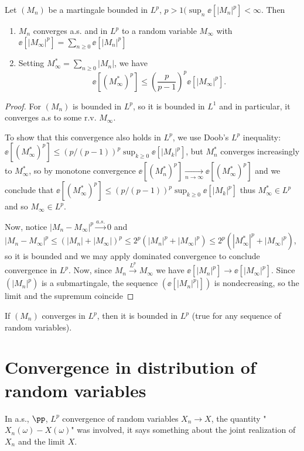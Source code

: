 \documentclass[../main.tex]{subfiles}
\begin{document}
\begin{theorem}
  [$L^p$ Martingales]
  Let $(M_n)$ be a martingale bounded in $L^p$, $p > 1 (\sup_{n} \ee[|M_n|^p]
  < \infty$. Then
  \begin{enumerate}
    \item $M_n$ converges a.s. and in $L^p$ to a random variable $M_{\infty}$
      with $\ee[|M_{\infty}|^p] = \sum_{n \geq 0}\ee[|M_n|^p]$
    \item Setting $M_{\infty}^* = \sum_{n \geq 0} |M_n|$, we have
      \[
        \ee[(M_{\infty}^*)^p] \leq \left(\frac{p}{p-1}\right)^p
        \ee[|M_{\infty}|^p] 
      .\] 
  \end{enumerate}
\end{theorem}
\begin{proof}
  For  $(M_n)$ is bounded in $L^p$, so it is bounded in $L^1$ and in
  particular, it converges a.s to some r.v. $M_\infty$. 

  To show that this
  convergence also holds in $L^p$, we use Doob's $L^p$ inequality:
  $\ee[(M_{\infty}^*)^p] \leq (p/(p-1))^p \sup_{k \geq 0} \ee[|M_k|^p]$, but 
  $M_n^*$ converges increasingly to $M_{\infty}^*$, so by monotone convergence
  $\ee[(M_n^{*})^p] \underset{n \to \infty}{\longrightarrow}
  \ee[(M_{\infty}^*)^p]$ and we conclude that $\ee[(M_{\infty}^*)^p] \leq
  (p/(p-1))^p \sup_{k \geq 0} \ee[|M_k|^p]$ thus $M_{\infty}^* \in L^p$ and so
   $M_{\infty} \in L^p$. 

   Now, notice $|M_n - M_{\infty}|^p \overset{a.s.}{\longrightarrow} 0$ and
   $|M_n - M_{\infty}|^p \leq (|M_n| + |M_{\infty}|)^p \leq 2^p (|M_n|^p +
   |M_{\infty}|^p) \leq 2^p (|M_{\infty}^*|^p +
   |M_{\infty}|^p)$, so it is bounded and we may apply dominated convergence
   to conclude convergence in $L^p$.
  Now, since $M_n \overset{L^p}{\longrightarrow} M_{\infty}$ we
   have $\ee[|M_n|^p] \to \ee[|M_{\infty}|^p]$. Since $(|M_n|^p)$ is a
   submartingale, the sequence $(\ee[|M_n|^p|])$ is nondecreasing, so the
   limit and the supremum coincide
\end{proof}
\begin{remark}
  If $(M_n)$ converges in $L^p$, then it is bounded in $L^p$ (true for any
  sequence of random variables).
\end{remark}

\section{Convergence in distribution of random variables}
In a.s., $\pp$, $L^p$ convergence of random variables $X_n \to X$, the
quantity "$X_n(\omega) - X(\omega)$" was involved, it says something about the
joint realization of $X_n$ and the limit $X$.
\end{document}
